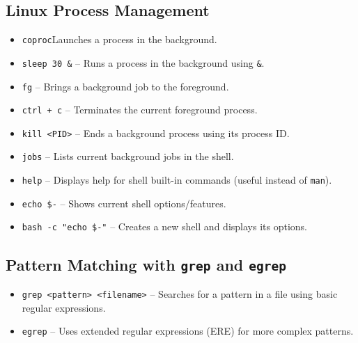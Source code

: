 \documentclass[a4paper,12pt=]{article}
\begin{document}
\subsection{Linux Process Management}
    \begin{itemize}
        \item \texttt{coproc}Launches a process in the background.
        \item \texttt{sleep 30 \&} – Runs a process in the background using \texttt{\&}.
        \item \texttt{fg} – Brings a background job to the foreground.
        \item \texttt{ctrl + c} – Terminates the current foreground process.
        \item \texttt{kill <PID>} – Ends a background process using its process ID.
        \item \texttt{jobs} – Lists current background jobs in the shell.
        \item \texttt{help} – Displays help for shell built-in commands (useful instead of \texttt{man}).
        \item \texttt{echo \$-} – Shows current shell options/features.
        \item \texttt{bash -c "echo \$-"} – Creates a new shell and displays its options.
    \end{itemize}
   
\subsection{Pattern Matching with \texttt{grep} and \texttt{egrep}}
    \begin{itemize}
       \item \texttt{grep <pattern> <filename>} – Searches for a pattern in a file using basic regular expressions.
        \item \texttt{egrep} – Uses extended regular expressions (ERE) for more complex patterns.
    \end{itemize}
    
\end{document}

